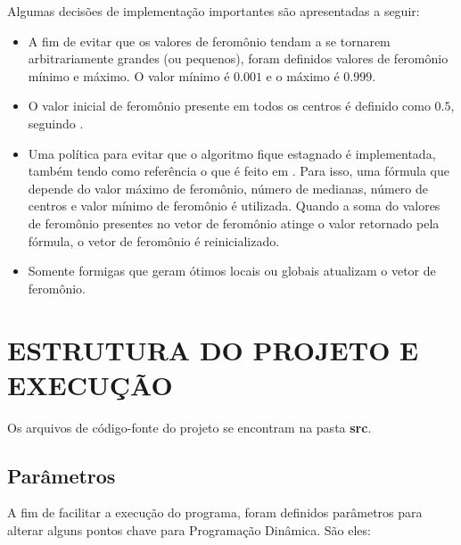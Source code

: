 \documentclass[12pt]{article}
\begin{document}
Algumas decisões de implementação importantes são apresentadas a seguir:

\begin{itemize}
 \item A fim de evitar que os valores de feromônio tendam a se tornarem arbitrariamente grandes 
 (ou pequenos), foram definidos valores de feromônio mínimo e máximo. O valor mínimo é $ 0.001 $
 e o máximo é $ 0.999 $.
 
 \item O valor inicial de feromônio presente em todos os centros é definido como $ 0.5 $, seguindo
 \cite{DBLP:journals/informaticaSI/FrancaZC05}.
 
 \item Uma política para evitar que o algoritmo fique estagnado é implementada, também tendo como 
 referência o que é feito em \cite{DBLP:journals/informaticaSI/FrancaZC05}. Para isso, uma fórmula
 que depende do valor máximo de feromônio, número de medianas, número de centros e valor mínimo de
 feromônio é utilizada. Quando a soma do valores de feromônio presentes no vetor de feromônio atinge
 o valor retornado pela fórmula, o vetor de feromônio é reinicializado.
 
 \item Somente formigas que geram ótimos locais ou globais atualizam o vetor de feromônio.
 
\end{itemize}

\section{ESTRUTURA DO PROJETO E EXECUÇÃO}

Os arquivos de código-fonte do projeto se encontram na pasta \textbf{src}. 

\subsection{Parâmetros}

A fim de facilitar a execução do programa, foram definidos parâmetros para alterar 
alguns pontos chave para Programação Dinâmica. São eles:
\end{document}
